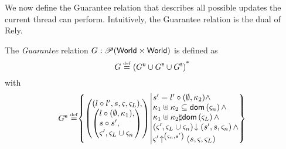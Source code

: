 We now define the Guarantee relation  that describes all possible updates the current thread can perform. Intuitively, the Guarantee relation is the dual of Rely.
%
\begin{definition}[Guarantee]
The \emph{Guarantee} relation $G: \mathscr{P} (\textsf{World} \times \textsf{World})$ is defined as
%
\[
	G \mathrel{\stackrel{\smash{\scriptscriptstyle{\mathrm{def}}}}{=}}  \left( G^{\textsf{u}} \cup G^{\textsf{e}} \cup G^{\textsf{s}} \right)^{\text{*}}
\]
%
with
%
\[
\begin{array}{@{} r @{} l @{}}

	\extendG \eqdef &
 	\left\{
	\begin{array}{@{} l @{\hspace*{2pt}} | @{\hspace*{2pt}} r @{}}
	   \left(
	   \begin{array}{@{} l @{}}
	     (l \composeL l', s, \amod{}, \amod{L}),\\
 	     \left(
	     \begin{array}{@{} l @{}}
	      l \composeL (\unitH, \ca{1}),\\
	      s \composeL s',\\
	      \amod{}', \amod{L} \cup \amod{n}
	     \end{array}
 	    \right)
	   \end{array}
 	  \right)
	   &
 	  	\begin{array}{@{} l @{}}
	 	  	s' = l' \composeL (\unitH, \ca{2})  \land\\
	 	  	
	 	  	\ca{1} \composeCap \ca{2} \subseteq \dom{\amod{n}} \land \\
	 	  	
	 	  	\ca{1} \composeCap \ca{2} \disjoint \dom{\amod{L}} \land \\
	 	  	
			\extendsAM{\amod{}', \amod{L} \cup \amod{n}}{s'}{s}{\amod{n}} \land \\
			

			\expandsAM{\amod{}'}{\amod{n}}{s'}{s}{\amod{}}{\amod{L}}
			
     	
   		\end{array}
 	\end{array}
	\right\}\\
	

\end{array}\]
\end{definition}
